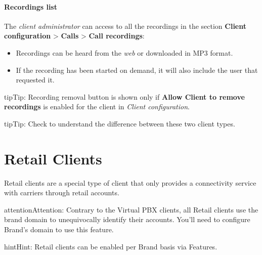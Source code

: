 \documentclass[letterpaper,10pt,english]{sphinxmanual}
\begin{document}
\paragraph{Recordings list}
\label{administration_portal/client/residential/calls/call_recordings:recordings-list}
The \emph{client administrator} can access to all the recordings in the section
\textbf{Client configuration} \textgreater{} \textbf{Calls} \textgreater{} \textbf{Call recordings}:
\begin{itemize}
\item {} 
Recordings can be heard from the \emph{web} or downloaded in MP3 format.

\item {} 
If the recording has been started on demand, it will also include the user
that requested it.

\end{itemize}

\begin{notice}{tip}{Tip:}
Recording removal button is shown only if \textbf{Allow Client to remove recordings} is enabled
for the client in \emph{Client configuration}.
\end{notice}

\begin{notice}{tip}{Tip:}
Check {\hyperref[administration_portal/brand/clients/retail:differences\string-between\string-retail\string-and\string-residential\string-clients]{}} to understand the difference between these two
client types.
\end{notice}


\section{Retail Clients}
\label{administration_portal/client/retail/index:retail-clients}\label{administration_portal/client/retail/index::doc}
Retail clients are a special type of client that only provides a connectivity
service with carriers through retail accounts.

\begin{notice}{attention}{Attention:}
Contrary to the Virtual PBX clients, all Retail clients use the
brand domain to unequivocally identify their accounts. You'll need to configure
Brand's domain to use this feature.
\end{notice}

\begin{notice}{hint}{Hint:}
Retail clients can be enabled per Brand basis via Features.
\end{notice}
\end{document}
